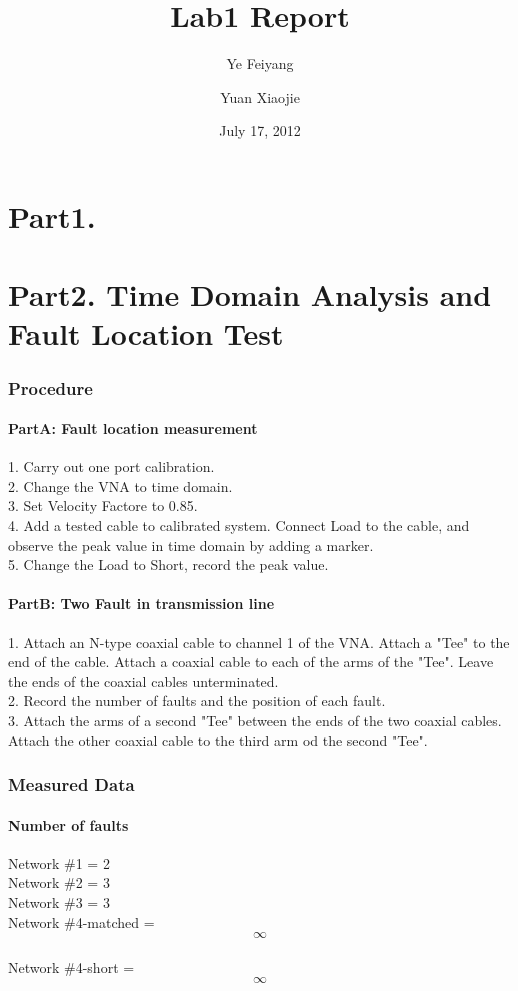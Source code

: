 \documentclass[11pt,oneside,a4paper]{report}
\begin{document}
\title{Lab1 Report}
\author{Ye Feiyang \and Yuan Xiaojie}
\date{July 17, 2012}
\maketitle

\part*{Part1. }

\part*{Part2. Time Domain Analysis and Fault Location Test}

\section*{Procedure}
\subsection*{PartA: Fault location measurement}
1. Carry out one port calibration.\\
2. Change the VNA to time domain.\\
3. Set Velocity Factore to 0.85.\\
4. Add a tested cable to calibrated system. Connect Load to the cable, and observe the peak value in time domain by adding a marker.\\
5. Change the Load to Short, record the peak value.
\subsection*{PartB: Two Fault in transmission line}
1. Attach an N-type coaxial cable to channel 1 of the VNA. Attach a "Tee" to the end of the cable. Attach a coaxial cable to each of the arms of the "Tee". Leave the ends of the coaxial cables unterminated.\\
2. Record the number of faults and the position of each fault.\\
3. Attach the arms of a second "Tee" between the ends of the two coaxial cables. Attach the other coaxial cable to the third arm od the second "Tee".\\

\section*{Measured Data}
\subsection*{Number of faults}
Network \#1 = 2\\
Network \#2 = 3\\
Network \#3 = 3\\
Network \#4-matched = \[\infty\]\\
Network \#4-short = \[\infty\]\\
\end{document}
